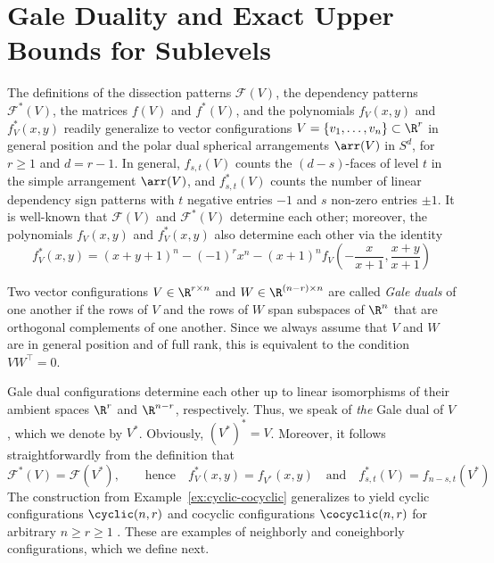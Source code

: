\section{Gale Duality and Exact Upper Bounds for Sublevels}
\label{sec:Gale}
%
The definitions of the dissection patterns $\mathcal{F}(V)$, the dependency patterns $\mathcal{F}^*(V)$, the matrices $f(V)$ and $f^*(V)$, and the polynomials $f_V(x,y)$ and $f^*_V(x,y)$ readily generalize to vector configurations $V=\{v_1,\dots,v_n\} \subset \R^r$ in general position and the polar dual spherical arrangements $\arr(V)$ in $S^d$, for $r\geq 1$ and $d=r-1$. In general, 
$f_{s,t}(V)$ counts the $(d-s)$-faces of level $t$ in the simple arrangement $\arr(V)$, and $f^*_{s,t}(V)$ counts the number of linear dependency sign patterns with $t$ negative entries $-1$ and $s$ non-zero entries $\pm 1$.
%
It is well-known that $\mathcal{F}(V)$ and $\mathcal{F}^*(V)$ determine each other; moreover, the polynomials $f_V(x,y)$ and $f^*_V(x,y)$ also determine each other \cite[Theorem~23]{SW:DS} via the identity
\begin{equation}
\label{eq:fstar-f}
f^*_V(x,y)=(x+y+1)^n - (-1)^r x^n -(x+1)^n f_V(\textstyle -\frac{x}{x+1},\frac{x+y}{x+1})
\end{equation}
%
%
 \begin{definition} 
\label{def:Gale}
Two vector configurations $V \in \R^{r\times n}$ and $W\in \R^{(n-r)\times n}$ are called \emph{Gale duals} of one another if the rows of $V$ and the rows of $W$ span subspaces of $\R^n$ that are orthogonal complements of one another. Since we always assume that $V$ and $W$ are in general position and of full rank, this is equivalent to the condition $VW^{\top} = 0$.
\end{definition}
%
Gale dual configurations determine each other up to linear isomorphisms of their ambient spaces $\R^r$ and $\R^{n-r}$, respectively. Thus, we %
speak of \emph{the} Gale dual of $V$, which we denote by $V^*$. Obviously, $(V^*)^*=V$.
Moreover, it follows straightforwardly from the definition that
\[\mathcal{F}^{*}(V)=\mathcal{F}(V^*),\qquad \textrm{hence} \quad f^*_V(x,y)=f_{V^*}(x,y) \quad \textrm{and}\quad f^*_{s,t}(V)=f_{n-s,t}(V^*)\]
%
The construction from Example~\ref{ex:cyclic-cocyclic} generalizes to yield cyclic configurations $\cyclic(n,r)$ and cocyclic configurations $\cocyclic(n,r)$ for arbitrary $n\geq r\geq 1$ \cite{Ziegler:1995aa,Matousek:2003aa}. These are examples of neighborly and coneighborly configurations, which we define next.
